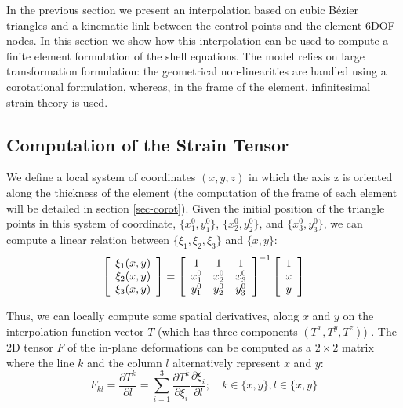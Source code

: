 \documentclass{egpubl}
\newcommand{\deriv}[2]{\frac{\partial #1}{\partial #2}}
\begin{document}
In the previous section we present an interpolation based on cubic B\'ezier triangles and a kinematic link between the control points and the element 6DOF nodes.
In this section we show how this interpolation can be used to compute a finite element formulation of the shell equations.
The model relies on large transformation formulation: the geometrical non-linearities are handled using a corotational formulation, whereas, in the frame of the element, infinitesimal strain theory is used.


\subsection{Computation of the Strain Tensor} %

We define a local system of coordinates $(x,y,z)$ in which the axis z is oriented along the thickness of the element (the computation of the frame of each element will be detailed in section \ref{sec-corot}). 
Given the initial position of the triangle points in this system of coordinate, $\{x_1^0, y_1^0\}$,  $\{x_2^0, y_2^0\}$, and  $\{x_3^0, y_3^0\}$, we can compute a linear relation between $\{\xi_1,\xi_2, \xi_3\}$ and $\{ x,y \}$:
%
\begin{equation}
\label{shape-vector}
\left[ \begin{array}[c]{c} \xi_1(x,y) \\ \xi_2(x,y) \\ \xi_3(x,y) \end{array} \right] =
\left[ \begin{array}[c]{ccc}
1 & 1 &  1 \\
x_1^0 & x_2^0 & x_3^0 \\
y_1^0 & y_2^0 & y_3^0
\end{array} \right] ^{-1} 
\left[ \begin{array}[c]{c} 1 \\ x \\ y \end{array} \right] 
\end{equation}

Thus, we can locally compute some spatial derivatives, along $x$ and $y$ on the interpolation function vector $T$ (which has three components $(T^x, T^y, T^z)$) .
The 2D tensor $F$ of the in-plane deformations can be computed as a $2\times2$ matrix where the line $k$ and the column $l$ alternatively represent $x$ and $y$:
%
\begin{equation}
    F_{kl} = \deriv{T^k}{l}  = 
    \sum_{i=1}^3 \deriv{T^k}{\xi_i} \deriv{\xi_i}{l};
    \quad k \in \{x,y\}, l \in \{x,y\}
\end{equation}
\end{document}
